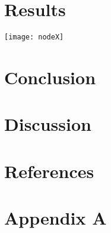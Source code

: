 \documentclass{article}
\begin{document}
  \newpage  
  \section{Results}
  \texttt{[image: nodeX]}

  \newpage  
  \section{Conclusion}

  \newpage 
  \section{Discussion} 

  \newpage  
  \section{References} 
  
   

  \newpage  
  \section{Appendix A}
\end{document}
